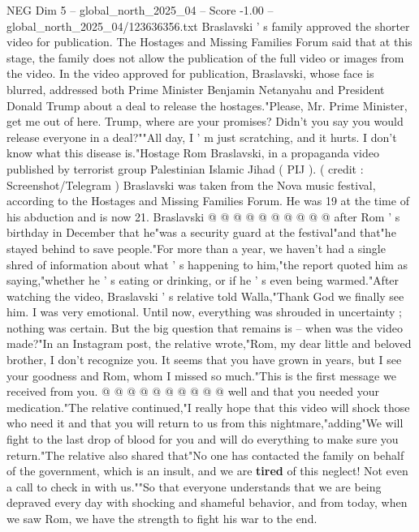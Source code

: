 \begin{textsample}{NEG Dim 5 – global\_north\_2025\_04 – Score -1.00 – global\_north\_2025\_04/123636356.txt}  \label{ex:f5_neg_362}
Braslavski ' s family approved the shorter video for publication.
The Hostages and Missing Families Forum said that at this stage, the family does not allow the publication of the full video or images from the video.
In the video approved for publication, Braslavski, whose face is blurred, addressed both Prime Minister Benjamin Netanyahu and President Donald Trump about a deal to release the hostages."Please, Mr.
Prime Minister, get me out of here.
Trump, where are your promises?
Didn't you say you would release everyone in a deal?""All day, I ' m just scratching, and it hurts.
I don't know what this disease is."Hostage Rom Braslavski, in a propaganda video published by terrorist group Palestinian Islamic Jihad ( PIJ ). ( credit : Screenshot/Telegram ) Braslavski was taken from the Nova music festival, according to the Hostages and Missing Families Forum.
He was 19 at the time of his abduction and is now 21.
Braslavski @ @ @ @ @ @ @ @ @ @ after Rom ' s birthday in December that he"was a security guard at the festival"and that"he stayed behind to save people."For more than a year, we haven't had a single shred of information about what ' s happening to him,"the report quoted him as saying,"whether he ' s eating or drinking, or if he ' s even being warmed."After watching the video, Braslavski ' s relative told Walla,"Thank God we finally see him.
I was very emotional.
Until now, everything was shrouded in uncertainty ; nothing was certain.
But the big question that remains is -- when was the video made?"In an Instagram post, the relative wrote,"Rom, my dear little and beloved brother, I don't recognize you.
It seems that you have grown in years, but I see your goodness and Rom, whom I missed so much."This is the first message we received from you. @ @ @ @ @ @ @ @ @ @ well and that you needed your medication."The relative continued,"I really hope that this video will shock those who need it and that you will return to us from this nightmare,"adding"We will fight to the last drop of blood for you and will do everything to make sure you return."The relative also shared that"No one has contacted the family on behalf of the government, which is an insult, and we are \textbf{tired} of this neglect!
Not even a call to check in with us.""So that everyone understands that we are being depraved every day with shocking and shameful behavior, and from today, when we saw Rom, we have the strength to fight his war to the end.

\end{textsample}

